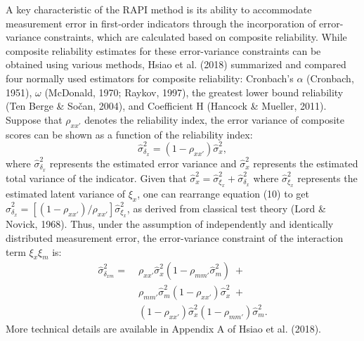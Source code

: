 \documentclass[
  man,mask]{apa6}
\begin{document}
A key characteristic of the RAPI method is its ability to accommodate measurement error in first-order indicators through the incorporation of error-variance constraints, which are calculated based on composite reliability. While composite reliability estimates for these error-variance constraints can be obtained using various methods, Hsiao et al. (2018) summarized and compared four normally used estimators for composite reliability: Cronbach's \(\alpha\) (Cronbach, 1951), \(\omega\) (McDonald, 1970; Raykov, 1997), the greatest lower bound reliability (Ten Berge \& Sočan, 2004), and Coefficient H (Hancock \& Mueller, 2011). Suppose that \(\rho_{xx'}\) denotes the reliability index, the error variance of composite scores can be shown as a function of the reliability index:
\begin{equation}
\hat{\sigma}^2_{\delta_{x}} = (1 - \rho_{xx'})\hat{\sigma}^2_{{x}},
\end{equation}
where \(\hat{\sigma}^2_{\delta_{x}}\) represents the estimated error variance and \(\hat{\sigma}^2_{{x}}\) represents the estimated total variance of the indicator. Given that \(\hat{\sigma}^2_{{x}} = {\hat{\sigma}^2_{\xi_{x}} + \hat{\sigma}^2_{\delta_{x}}}\) where \(\hat{\sigma}^2_{\xi_{x}}\) represents the estimated latent variance of \(\xi_{x}\), one can rearrange equation (10) to get \(\hat{\sigma}_{\delta_{x}}^2 = [(1 - \rho_{xx'})/{\rho_{xx'}}]\hat{\sigma}^2_{\xi_{x}}\), as derived from classical test theory (Lord \& Novick, 1968). Thus, under the assumption of independently and identically distributed measurement error, the error-variance constraint of the interaction term \(\xi_{x}\xi_{m}\) is:
\begin{equation}
\begin{aligned}
\hat{\sigma}^2_{\delta_{xm}} =\; & \rho_{xx'}\hat{\sigma}^2_{{x}}(1 - \rho_{mm'}\hat{\sigma}^2_{{m}})\; + \\&
                        \rho_{mm'}\hat{\sigma}^2_{{m}}(1-\rho_{xx'})\hat{\sigma}^2_{{x}}\; + \\&
                        (1 - \rho_{xx'})\hat{\sigma}^2_{{x}}(1 - \rho_{mm'})\hat{\sigma}^2_{{m}}. 
\end{aligned}
\end{equation}
More technical details are available in Appendix A of Hsiao et al. (2018).
\end{document}
